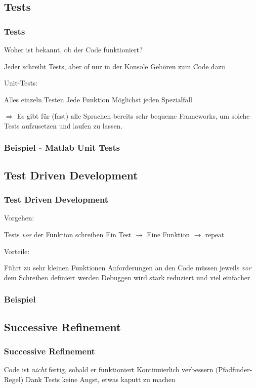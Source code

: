 \documentclass{beamer}
\begin{document}
\subsection{Tests}
\begin{frame}
    \frametitle{Tests}
    Woher ist bekannt, ob der Code funktioniert?\pause

    \begin{outline}
        \1 Jeder schreibt Tests, aber of nur in der Konsole
        \1 Gehören zum Code dazu
    \end{outline} \pause

    Unit-Tests:
    \begin{outline}
        \1 Alles einzeln Testen
            \2 Jede Funktion
            \2 Möglichst jeden Spezialfall
    \end{outline}
    $\Rightarrow$ Es gibt für (fast) alle Sprachen bereits sehr bequeme
    Frameworks, um solche Tests aufzusetzen und laufen zu lassen.
\end{frame}
\begin{frame}
    \frametitle{Beispiel - Matlab Unit Tests}
\end{frame}
\subsection{Test Driven Development}
\begin{frame}
    \frametitle{Test Driven Development}
    Vorgehen:

    \begin{outline}
        \1 Tests \emph{vor} der Funktion schreiben
        \1 Ein Test $\rightarrow$ Eine Funktion $\rightarrow$ repeat
    \end{outline}\pause

    Vorteile:

    \begin{outline}
        \1 Führt zu sehr kleinen Funktionen
        \1 Anforderungen an den Code müssen jeweils \emph{vor} dem Schreiben
        definiert werden
        \1 Debuggen wird stark reduziert und viel einfacher
    \end{outline}
\end{frame}
\begin{frame}
    \frametitle{Beispiel}
\end{frame}

\subsection{Successive Refinement}
\begin{frame}
    \frametitle{Successive Refinement}
    \begin{outline}
        \1 Code ist \emph{nicht} fertig, sobald er funktioniert
        \1 Kontinuierlich verbessern (Pfadfinder-Regel)
        \1 Dank Tests keine Angst, etwas kaputt zu machen
    \end{outline}
\end{frame}
\end{document}
